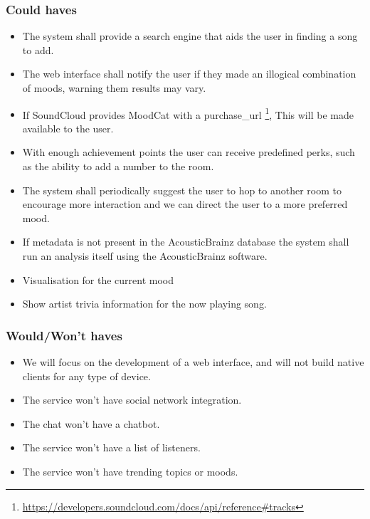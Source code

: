 \subsubsection{Could haves}
\begin{itemize}
\item The system shall provide a search engine that aids the user in finding a song to add.

\item The web interface shall notify the user if they made an illogical combination of moods, warning them results may vary.

\item If SoundCloud provides MoodCat with a purchase\_url \footnote{\url{https://developers.soundcloud.com/docs/api/reference\#tracks}}, This will be made available to the user.

\item With enough achievement points the user can receive predefined perks, such as the ability to add a number to the room.

\item The system shall periodically suggest the user to hop to another room to encourage more interaction and we can direct the user to a more preferred mood.

\item If metadata is not present in the AcousticBrainz database the system shall run an analysis itself using the AcousticBrainz software.

\item Visualisation for the current mood


\item Show artist trivia information for the now playing song.

\end{itemize}

\subsubsection{Would/Won't haves}
\begin{itemize}
\item We will focus on the development of a web interface, and will not build native clients for any type of device.

\item The service won't have social network integration.

\item The chat won't have a chatbot.

\item The service won't have a list of listeners.

\item The service won't have trending topics or moods.

\end{itemize}

